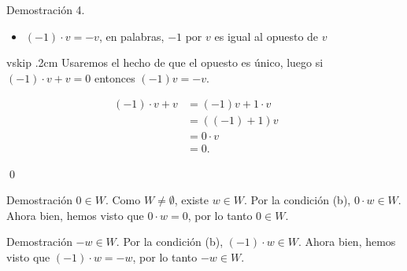 \documentclass[handout]{beamer} %
\newcommand{\K}{\mathbb K}
\begin{document}
\begin{frame}

    \begin{block}{Demostración 4.}\pause
\begin{itemize}
    \item $(-1)\cdot v=-v$, en palabras, $-1$ por $v$ es igual al opuesto de $v$
\end{itemize}
vskip .2cm
Usaremos el  hecho de que el opuesto es único, luego si $(-1)\cdot v + v = 0$ entonces $(-1)v = -v$.

\begin{align*}
(-1)\cdot v + v &=(-1)v + 1\cdot v &&\text{}\\
&=((-1)+1)v&&\text{}\\
&=0 \cdot v&&\text{}\\
&=0.
\end{align*}
\end{block} \qed
\end{frame}


\begin{frame}

\begin{block}{Demostración $0 \in W$.}\pause
    Como $W \ne \emptyset$, existe $w \in W$. Por la condición (b), $0\cdot w \in W$. Ahora bien,  hemos visto que $0\cdot w =0$, por lo tanto $0 \in W$.
\end{block}
\pause
\begin{block}{Demostración $-w \in W$.}\pause
    Por la condición (b), $(-1)\cdot w \in W$. Ahora bien,  hemos visto que $(-1)\cdot w =-w$, por lo tanto $-w \in W$.
\end{block}
\vskip 2cm


\end{frame}
\end{document}
